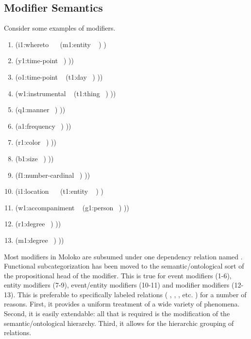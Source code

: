 \subsection{Modifier Semantics}

Consider some examples of modifiers.

\begin{enumerate}

\item {}(i1:whereto \wand\    \wand\ (m1:entity \wand\  ) ) 
\item {}(y1:time-point \wand\ ) ))
\item {}(o1:time-point \wand\   (t1:day \wand\ ) ))
\item {}(w1:instrumental \wand\   (t1:thing \wand\ ) ))
\item {}(q1:manner \wand\ ) ))
\item {}(a1:frequency \wand\ ) ))\\

\item {}(r1:color \wand\ ) ))
\item {}(b1:size \wand\ ) ))
\item {}(f1:number-cardinal \wand\ ) ))\\

\item {}(i1:location \wand\    \wand\ (t1:entity \wand\  ) ) 
\item {}(w1:accompaniment \wand\   (g1:person \wand\ ) ))\\

\item {}(r1:degree \wand\ ) ))
\item {}(m1:degree \wand\ ) ))

\end{enumerate}
Most modifiers in Moloko are subsumed under one dependency relation named . Functional subcategorization has been moved to the semantic/ontological sort of the propositional head of the modifier. This is true for event modifiers (1-6), entity modifiers (7-9), event/entity modifiers (10-11) and modifier modifiers (12-13). This is preferable to specifically labeled relations (  ,  ,  ,  etc. ) for a number of reasons. First, it provides a uniform  treatment of a wide variety of phenomena. Second, it is easily extendable: all that is required is the modification of the semantic/ontological hierarchy. Third, it allows for the hierarchic grouping of relations.

